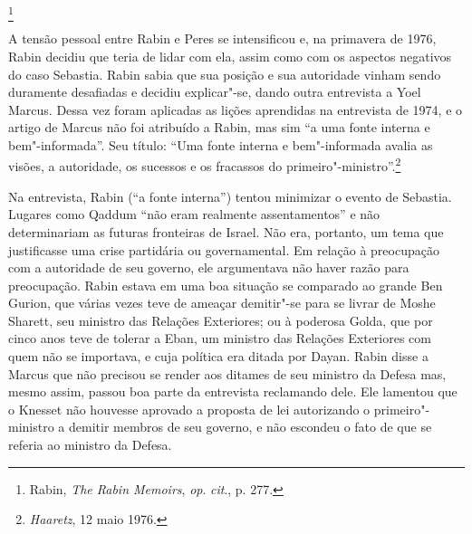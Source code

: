 \footnote{Rabin,
\textit{The Rabin Memoirs}, \textit{op}. \textit{cit}., p. 277.} 

A tensão pessoal entre Rabin e Peres se intensificou e, na primavera de
1976, Rabin decidiu que teria de lidar com ela, assim como com os
aspectos negativos do caso Sebastia. Rabin sabia que sua posição e sua
autoridade vinham sendo duramente desafiadas e decidiu explicar"-se, dando
outra entrevista a Yoel Marcus. Dessa vez foram aplicadas as lições
aprendidas na entrevista de 1974, e o artigo de Marcus não foi atribuído
a Rabin, mas sim ``a uma fonte interna e bem"-informada''. Seu título:
``Uma fonte interna e bem"-informada avalia as visões, a autoridade, os
sucessos e os fracassos do primeiro"-ministro''.\footnote{\textit{Haaretz}, 12 maio 1976.}

Na entrevista, Rabin (``a fonte interna'') tentou minimizar o evento
de Sebastia. Lugares como Qaddum ``não eram realmente assentamentos'' e
não determinariam as futuras fronteiras de Israel. Não era, portanto, um
tema que justificasse uma crise partidária ou governamental. Em relação
à preocupação com a autoridade de seu governo, ele argumentava não haver
razão para preocupação. Rabin estava em uma boa situação se
comparado ao grande Ben Gurion, que várias vezes teve de ameaçar
demitir"-se para se livrar de Moshe Sharett, seu ministro das Relações
Exteriores; ou à poderosa Golda, que por cinco anos teve de tolerar a
Eban, um ministro das Relações Exteriores com quem não se importava, e
cuja política era ditada por Dayan. Rabin disse a Marcus que não precisou
se render aos ditames de seu ministro da Defesa mas, mesmo assim,
passou boa parte da entrevista reclamando dele. Ele lamentou que o
Knesset não houvesse aprovado a proposta de lei autorizando o primeiro"-ministro
a demitir membros de seu governo, e não escondeu o fato de que
se referia ao ministro da Defesa.


